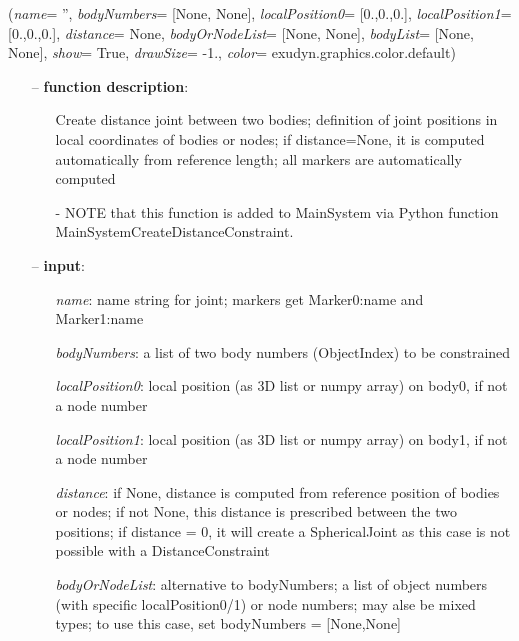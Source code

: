 %
\begin{flushleft}
\label{sec:mainsystemextensions:CreateDistanceConstraint}
({\it name}= '', {\it bodyNumbers}= [None, None], {\it localPosition0}= [0.,0.,0.], {\it localPosition1}= [0.,0.,0.], {\it distance}= None, {\it bodyOrNodeList}= [None, None], {\it bodyList}= [None, None], {\it show}= True, {\it drawSize}= -1., {\it color}= exudyn.graphics.color.default)
\end{flushleft}
\setlength{\itemindent}{0.7cm}
\begin{itemize}[leftmargin=0.7cm]
\item[--]
{\bf function description}: \vspace{-6pt}
\begin{itemize}[leftmargin=1.2cm]
\setlength{\itemindent}{-0.7cm}
\item[]Create distance joint between two bodies; definition of joint positions in local coordinates of bodies or nodes; if distance=None, it is computed automatically from reference length; all markers are automatically computed
\item[]- NOTE that this function is added to MainSystem via Python function MainSystemCreateDistanceConstraint.
\end{itemize}
\item[--]
{\bf input}: \vspace{-6pt}
\begin{itemize}[leftmargin=1.2cm]
\setlength{\itemindent}{-0.7cm}
\item[]{\it name}: name string for joint; markers get Marker0:name and Marker1:name
\item[]{\it bodyNumbers}: a list of two body numbers (ObjectIndex) to be constrained
\item[]{\it localPosition0}: local position (as 3D list or numpy array) on body0, if not a node number
\item[]{\it localPosition1}: local position (as 3D list or numpy array) on body1, if not a node number
\item[]{\it distance}: if None, distance is computed from reference position of bodies or nodes; if not None, this distance is prescribed between the two positions; if distance = 0, it will create a SphericalJoint as this case is not possible with a DistanceConstraint
\item[]{\it bodyOrNodeList}: alternative to bodyNumbers; a list of object numbers (with specific localPosition0/1) or node numbers; may alse be mixed types; to use this case, set bodyNumbers = [None,None]

\end{itemize}
\end{itemize}
